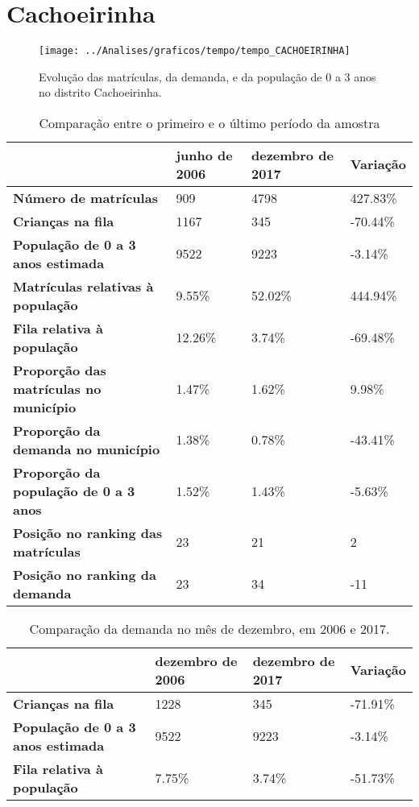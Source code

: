\section{Cachoeirinha}
\begin{figure}[H]
\centering
\texttt{[image: ../Analises/graficos/tempo/tempo\_CACHOEIRINHA]}
\caption{Evolução das matrículas, da demanda, e da população de 0 a 3 anos no distrito Cachoeirinha.}
\end{figure}
\begin{table}[H]
\begin{tabular}{|l|l|l|l|}
\hline
\textbf{}                                      & \textbf{junho de 2006}       & \textbf{dezembro de 2017}    & \textbf{Variação} \\ \hline
\textbf{Número de matrículas}                  & 909 & 4798 & 427.83\% \\ \hline
\textbf{Crianças na fila}                      & 1167 & 345 & -70.44\% \\ \hline
\textbf{População de 0 a 3 anos estimada}      & 9522 & 9223 & -3.14\% \\ \hline
\textbf{Matrículas relativas à população}      & 9.55\% & 52.02\% & 444.94\% \\ \hline
\textbf{Fila relativa à população}             & 12.26\% & 3.74\% & -69.48\% \\ \hline
\textbf{Proporção das matrículas no município} & 1.47\% & 1.62\% & 9.98\% \\ \hline
\textbf{Proporção da demanda no município}     & 1.38\% & 0.78\% & -43.41\% \\ \hline
\textbf{Proporção da população de 0 a 3 anos}  & 1.52\% & 1.43\% & -5.63\% \\ \hline
\textbf{Posição no ranking das matrículas}     & 23 & 21 & 2 \\ \hline
\textbf{Posição no ranking da demanda}         & 23 & 34 & -11 \\ \hline
\end{tabular}
\caption{Comparação entre o primeiro e o último período da amostra}
\end{table}
\begin{table}[H]
\begin{tabular}{|l|l|l|l|}
\hline
\textbf{}                                 & \textbf{dezembro de 2006} & \textbf{dezembro de 2017} & \textbf{Variação} \\ \hline
\textbf{Crianças na fila}                      & 1228 & 345 & -71.91\% \\ \hline
\textbf{População de 0 a 3 anos estimada}      & 9522 & 9223 & -3.14\% \\ \hline
\textbf{Fila relativa à população}             & 7.75\% & 3.74\% & -51.73\% \\ \hline
\end{tabular}
\caption{Comparação da demanda no mês de dezembro, em 2006 e 2017.}
\end{table}
